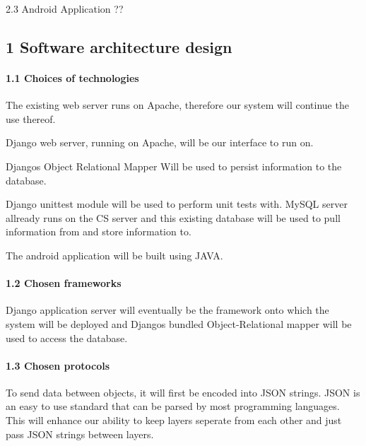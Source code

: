 \documentclass{article}
\begin{document}
    2.3  Android Application ??



 


\subsection{1  Software architecture design}

 


\paragraph{1.1  Choices of technologies}



The existing web server runs on Apache, therefore our system will continue the use thereof.



Django web server, running on Apache, will be our interface to run on.



Djangos Object Relational Mapper Will be used to persist information to the database.



Django unittest module will be used to perform unit tests with. MySQL server allready runs on the CS server and this existing database will be used to pull information from and store information to.



The android application will be built using JAVA.




\paragraph{1.2  Chosen frameworks}

 Django application server will eventually be the framework onto which the system will be deployed and Djangos bundled Object-Relational mapper will be used to access the database. 


\paragraph{1.3  Chosen protocols}

To send data between objects, it will first be encoded into JSON strings. JSON is an easy to use standard that can be parsed by most programming languages. This will enhance our ability to keep layers seperate from each other and just pass JSON strings between layers. 
\end{document}
